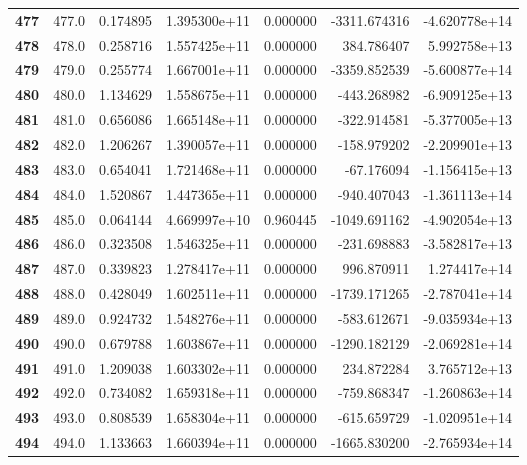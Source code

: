 \documentclass{report}[12pt]
\begin{document}
\begin{center}
\begin{tabular}{lrrrrrr}
\textbf{477 } &          477.0 &   0.174895 &  1.395300e+11 &    0.000000 & -3311.674316 & -4.620778e+14 \\
\textbf{478 } &          478.0 &   0.258716 &  1.557425e+11 &    0.000000 &   384.786407 &  5.992758e+13 \\
\textbf{479 } &          479.0 &   0.255774 &  1.667001e+11 &    0.000000 & -3359.852539 & -5.600877e+14 \\
\textbf{480 } &          480.0 &   1.134629 &  1.558675e+11 &    0.000000 &  -443.268982 & -6.909125e+13 \\
\textbf{481 } &          481.0 &   0.656086 &  1.665148e+11 &    0.000000 &  -322.914581 & -5.377005e+13 \\
\textbf{482 } &          482.0 &   1.206267 &  1.390057e+11 &    0.000000 &  -158.979202 & -2.209901e+13 \\
\textbf{483 } &          483.0 &   0.654041 &  1.721468e+11 &    0.000000 &   -67.176094 & -1.156415e+13 \\
\textbf{484 } &          484.0 &   1.520867 &  1.447365e+11 &    0.000000 &  -940.407043 & -1.361113e+14 \\
\textbf{485 } &          485.0 &   0.064144 &  4.669997e+10 &    0.960445 & -1049.691162 & -4.902054e+13 \\
\textbf{486 } &          486.0 &   0.323508 &  1.546325e+11 &    0.000000 &  -231.698883 & -3.582817e+13 \\
\textbf{487 } &          487.0 &   0.339823 &  1.278417e+11 &    0.000000 &   996.870911 &  1.274417e+14 \\
\textbf{488 } &          488.0 &   0.428049 &  1.602511e+11 &    0.000000 & -1739.171265 & -2.787041e+14 \\
\textbf{489 } &          489.0 &   0.924732 &  1.548276e+11 &    0.000000 &  -583.612671 & -9.035934e+13 \\
\textbf{490 } &          490.0 &   0.679788 &  1.603867e+11 &    0.000000 & -1290.182129 & -2.069281e+14 \\
\textbf{491 } &          491.0 &   1.209038 &  1.603302e+11 &    0.000000 &   234.872284 &  3.765712e+13 \\
\textbf{492 } &          492.0 &   0.734082 &  1.659318e+11 &    0.000000 &  -759.868347 & -1.260863e+14 \\
\textbf{493 } &          493.0 &   0.808539 &  1.658304e+11 &    0.000000 &  -615.659729 & -1.020951e+14 \\
\textbf{494 } &          494.0 &   1.133663 &  1.660394e+11 &    0.000000 & -1665.830200 & -2.765934e+14 \\

\end{tabular}
\end{center}
\end{document}
